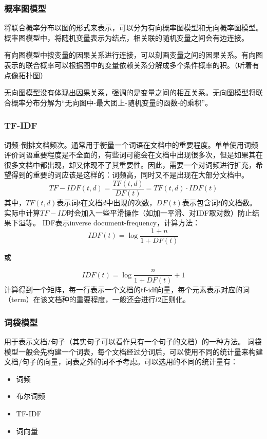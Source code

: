 \subsubsection{概率图模型}
将联合概率分布以图的形式来表示，可以分为有向概率图模型和无向概率图模型。
概率图模型中，将随机变量表示为结点，相关联的随机变量之间会有边连接。

有向图模型中按变量的因果关系进行连接，可以刻画变量之间的因果关系。有向图表示的联合概率可以根据图中的变量依赖关系分解成多个条件概率的积。（听着有点像拓扑图）

无向图模型没有体现出因果关系，强调的是变量之间的相互关系。无向图模型将联合概率分布分解为“无向图中-最大团上-随机变量的函数-的乘积”。



\subsubsection{TF-IDF}
词频-倒排文档频次。通常用于衡量一个词语在文档中的重要程度。单单使用词频评价词语重要程度是不全面的，有些词可能会在文档中出现很多次，但是如果其在很多文档中都出现，却又体现不了其重要性。因此，需要一个对词频进行扩充，希望得到的重要的词应该是这样的：词频高，同时又不是出现在大部分文档中。
$$
TF-IDF(t, d) = \frac{TF(t, d)}{DF(t)} = TF(t, d) \cdot IDF(t)
$$
其中，$TF(t, d)$表示词$t$在文档$d$中出现的次数，$DF(t)$表示包含词$t$的文档数。实际中计算$TF-ID$时会加入一些平滑操作（如加一平滑、对IDF取对数）防止结果下溢等。 IDF表示inverse document-frequency，计算方法：
$$
IDF(t) = \log \frac{1 + n}{1 + DF(t)}
$$
\begin{center}
	或
\end{center}
$$
IDF(t) = \log \frac{n}{1 + DF(t)} + 1
$$
计算得到一个矩阵，每一行表示一个文档的tf-idf向量，每个元素表示对应的词（term）在该文档种的重要程度，一般还会进行$l2$正则化。

\subsubsection{词袋模型}
用于表示文档/句子（其实句子可以看作只有一个句子的文档）的一种方法。
词袋模型一般会先构建一个词表，每个文档经过分词后，可以使用不同的统计量来构建文档/句子的向量，词表之外的词不予考虑。可以选用的不同的统计量有：
\begin{itemize}
	\item 词频
	\item 布尔词频
	\item TF-IDF
	\item 词向量
\end{itemize}

